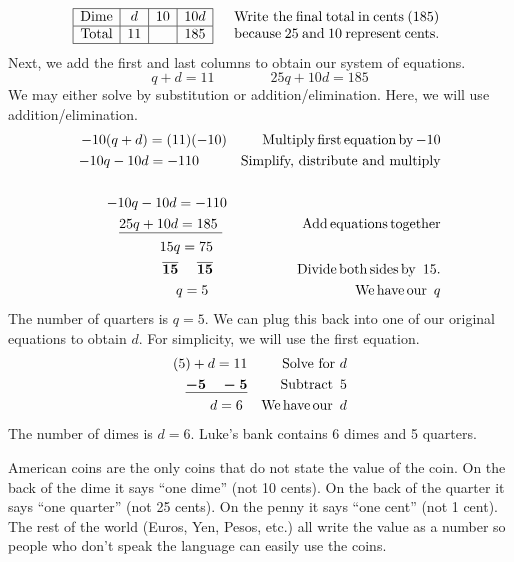 \begin{example}
\begin{eqnarray*}
\begin{array}{|c|c|c|c|}
      \hline
      \tmop{Dime} & d & 10 & 10 d\\
      \hline
      \tmop{Total} & 11 &  & 185\\
      \hline
    \end{array} &  & \begin{array}{p{0.425\textwidth}}
      \tmop{Write~the} \tmop{final} \tmop{total} \tmop{in} \tmop{cents} (185)
      \tmop{because} 25 \tmop{and} 10 \tmop{represent} \tmop{cents}.
    \end{array}%
		\end{eqnarray*}
		Next, we add the first and last columns to obtain our system of equations.
		$$q + d = 11\qquad\qquad 25 q + 10 d = 185$$
		We may either solve by substitution or addition/elimination.  Here, we will use addition/elimination.
	\begin{eqnarray*}
    - 10 (q + d) = (11) (- 10) &  & \operatorname{Multiply} \operatorname{first} \operatorname{equation} \operatorname{by} - 10\\
    - 10 q - 10 d = - 110~~~~~~ &  &\text{Simplify,~distribute~and~multiply} \\
    &  & \\
    - 10 q - 10 d = - 110 &  & \\
    \underline{25 q + 10 d = 185~}~ &  & \operatorname{Add} \operatorname{equations} \operatorname{together}\\
    15 q = 75~~~ &  & \\
    \boldsymbol{\overline{15} ~~~~ \overline{15}}~~~ &  & \operatorname{Divide} \operatorname{both} \operatorname{sides} \operatorname{by~} 15.\\
    q = 5~~~~ &  & \operatorname{We} \operatorname{have} \operatorname{our~} q\\
 \end{eqnarray*}
The number of quarters is $q=5$.  We can plug this back into one of our original equations to obtain $d$.  For simplicity, we will use the first equation.
 \begin{eqnarray*}
    (5) + d = 11 &  & \text{Solve~for~} d\\
    \boldsymbol{\underline{- 5 ~~~- 5}} &  & \operatorname{Subtract~} 5\\
    d = 6~ &  & \operatorname{We} \operatorname{have} \operatorname{our~} d
  \end{eqnarray*}
The number of dimes is $d=6$.  Luke's bank contains 6 dimes and 5 quarters.
\end{example}
 
{} American coins are the only coins that do not
state the value of the coin. On the back of the dime it says ``one dime'' (not
10 cents). On the back of the quarter it says ``one quarter'' (not 25 cents).
On the penny it says ``one cent'' (not 1 cent). The rest of the world (Euros,
Yen, Pesos, etc.) all write the value as a number so people who don't speak the
language can easily use the coins.\pp

